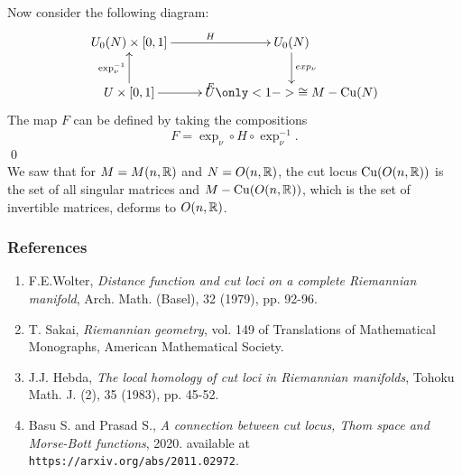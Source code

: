 \documentclass{beamer}
\begin{document}
		\begin{frame}
			Now consider the following diagram:
			\begin{align*}
				\xymatrix{
					U_0(N) \times [0,1] \ar[r]^H  				   & U_0(N) \ar[d]^{exp_\nu} \\  
					U \times [0,1] \ar[u]^{\exp_\nu^{-1}} \ar[r]^F & U \only<1->{\cong M-\cutn }
				}
			\end{align*}
			\p[2] 
			The map $F$ can be defined by taking the compositions
			\begin{displaymath}
				F = \exp_\nu \circ H \circ \exp_\nu^{-1}.
			\end{displaymath}
			\hspace{11cm} \qed \\

			\p[3] We saw that for $M= M(n,\mathbb{R})$ and $N=O(n,\mathbb{R})$, the cut locus $\mathrm{Cu}(O(n,\mathbb{R}))$ is the set of all singular matrices and $M-\mathrm{Cu}(O(n,\mathbb{R}))$, which is the set of invertible matrices, deforms to $O(n,\mathbb{R})$.
		\end{frame}	


		\begin{frame}
			\frametitle<presentation>{References}
			\begin{enumerate}
				\item F.E.Wolter, \emph{Distance function and cut loci on a complete Riemannian manifold}, Arch. Math. (Basel), 32 (1979), pp. 92-96.
				\item T. Sakai, \emph{Riemannian geometry}, vol. 149 of Translations of Mathematical Monographs, American Mathematical Society.
				\item J.J. Hebda, \emph{The local homology of cut loci in Riemannian manifolds}, Tohoku Math. J. (2), 35 (1983), pp. 45-52.
				\item Basu S. and Prasad S., \emph{A connection between cut locus, Thom space and Morse-Bott functions}, 2020. available at \texttt{https://arxiv.org/abs/2011.02972}.
			\end{enumerate}
		\end{frame}	
\end{document}

